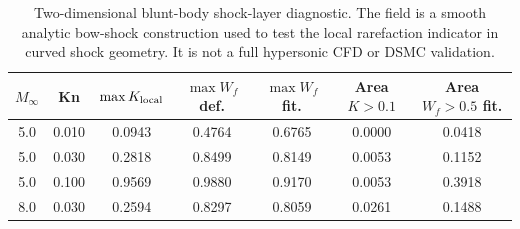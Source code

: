 \begin{table}[t]
\centering
\caption{Two-dimensional blunt-body shock-layer diagnostic. The field is a smooth analytic bow-shock construction used to test the local rarefaction indicator in curved shock geometry. It is not a full hypersonic CFD or DSMC validation.}
\label{tab:exp20_blunt_body}
\begin{tabular}{ccccccc}
\toprule
$M_\infty$ & Kn & $\max K_{\rm local}$ & $\max W_f$ def. & $\max W_f$ fit. & Area $K>0.1$ & Area $W_f>0.5$ fit. \\
\midrule
5.0 & 0.010 & 0.0943 & 0.4764 & 0.6765 & 0.0000 & 0.0418 \\
5.0 & 0.030 & 0.2818 & 0.8499 & 0.8149 & 0.0053 & 0.1152 \\
5.0 & 0.100 & 0.9569 & 0.9880 & 0.9170 & 0.0053 & 0.3918 \\
8.0 & 0.030 & 0.2594 & 0.8297 & 0.8059 & 0.0261 & 0.1488 \\
\bottomrule
\end{tabular}
\end{table}
